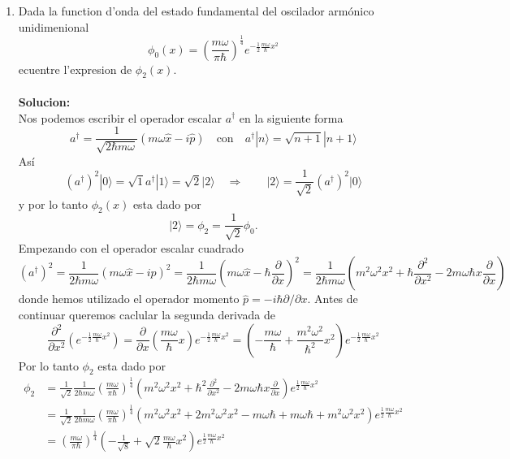\begin{enumerate}
\item Dada la function d'onda del estado fundamental del oscilador armónico
unidimenional
\begin{equation*}
	\phi_0 (x) = \left(\frac{m\omega}{\pi \hbar}\right)^{\frac{1}{4}} e^{-\frac{1}{2}
\frac{m\omega}{\hbar} x^2}
\end{equation*}
ecuentre l'expresion de $\phi_2(x)$. \\\\
\textbf{Solucion:} \\
Nos podemos escribir el operador escalar $a^\dagger$ en la siguiente forma
\begin{equation*}
	a^\dagger = \frac{1}{\sqrt{2\hbar m\omega}}(m \omega \hat x - i \hat p) \quad
\text{con} \quad a^\dagger | n \rangle = \sqrt{n+1} | n+1 \rangle
\end{equation*}
Así
\begin{equation*}
	(a^\dagger )^2 | 0 \rangle = \sqrt{1} a^\dagger | 1 \rangle = \sqrt{2} | 2
\rangle \quad \Rightarrow \qquad | 2\rangle = \frac{1}{\sqrt{2}}(a^\dagger)^2 | 0 \rangle
\end{equation*}
y por lo tanto $\phi_2 (x)$ esta dado por
\begin{equation*}
	|2\rangle = \phi_2 = \frac{1}{\sqrt{2}} \phi_0.
\end{equation*}
Empezando con el operador escalar cuadrado
\begin{equation*}
	(a^\dagger )^2 = \frac{1}{2\hbar m \omega} (m \omega \hat x - i \hat p)^2 =
\frac{1}{2\hbar m \omega} \left(m \omega \hat x - \hbar \frac{\partial}{\partial
x}\right)^2 = \frac{1}{2\hbar m \omega} \left(m^2 \omega^2 x^2 + \hbar
\frac{\partial^2}{\partial x^2} - 2 m \omega \hbar x \frac{\partial}{\partial
x}\right)
\end{equation*}
donde hemos utilizado el operador momento $\hat p = - i \hbar \partial/\partial
x$. Antes de continuar queremos caclular la segunda derivada de 
\begin{equation*}
	\frac{\partial^2}{\partial x^2} \left(e^{-\frac{1}{2} \frac{m\omega}{\hbar}
x^2}\right) = \frac{\partial}{\partial x} \left(\frac{m \omega}{\hbar} x \right)
e^{-\frac{1}{2} \frac{m\omega}{\hbar} x^2} = \left(-\frac{m\omega}{\hbar} +
\frac{m^2\omega^2}{\hbar^2}x^2\right) e^{-\frac{1}{2}\frac{m\omega}{\hbar} x^2}
\end{equation*}
Por lo tanto $\phi_2$ esta dado por
\begin{align*}
	\phi_2 &= \frac{1}{\sqrt{2}} \frac{1}{2 \hbar m \omega}
\left(\frac{m\omega}{\pi\hbar}\right)^{\frac{1}{4}} \left(m^2 \omega^2 x^2 +
\hbar^2 \frac{\partial^2}{\partial x^2} - 2m\omega\hbar x
\frac{\partial}{\partial x} \right) e^{\frac{1}{2} \frac{m\omega}{\hbar}x^2} \\
	&= \frac{1}{\sqrt{2}} \frac{1}{2\hbar m\omega}
\left(\frac{m\omega}{\pi\hbar}\right)^{\frac{1}{4}} \left(m^2 \omega^2 x^2 + 2
m^2 \omega^2 x^2 - m \omega \hbar + m \omega \hbar + m^2 \omega^2 x^2 \right)
e^{\frac{1}{2} \frac{m \omega}{\hbar} x^2} \\
	&= \left(\frac{m\omega}{\pi\hbar}\right)^{\frac{1}{4}}
\left(-\frac{1}{\sqrt{8}} + \sqrt{2} \frac{m\omega}{\hbar} x^2 \right)
e^{\frac{1}{2} \frac{m\omega}{\hbar} x^2}
\end{align*}


\end{enumerate}
